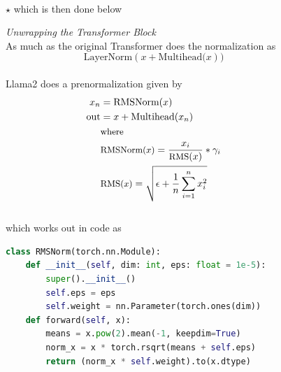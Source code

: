\documentclass[12pt]{article}
\newcommand{\customtext}[3]{%
    \vspace{#2} %
    \fontsize{13}{8}\textcolor{#1}{\textit{#3}}%
}
\newcommand{\sidecite}[1]{\textsuperscript{\textcolor{blue}{\textbf{\scriptsize#1}}}}
\newcommand{\maincitecount}{\sidecite{\stepcounter{maincite}\themaincite}}
\begin{document}
\pagebreak
\begin{figure}[!htb]
    \begin{minipage}[t]{0.65\textwidth}
    \raggedright
$\star$ which is then done below{\maincitecount}\\
\customtext{xtitle}{0em}{Unwrapping the Transformer Block}\\
As much as the original Transformer does the normalization as
\vspace{-1em}
$$\text{LayerNorm}(x  + \text{Multihead(}x))$$
\vspace{-2.7em}\\
Llama2 does a prenormalization given by
\vspace{-1em}
\begin{align*}
    x_n & = \text{RMSNorm}(x)\\
    \text{out} & = x  + \text{Multihead(}x_n)\\
    & \text{\small where}\\
    & \text{\small RMSNorm($x$)}=\frac{x_i}{\text{\small RMS}(x)}*\gamma_i\\
    & \text{\small RMS($x$)} = \sqrt{\epsilon+\frac{1}{n}\sum_{i=1}^nx_i^2}
\end{align*}
\vspace{-1.5em}\\
which works out in code as 
\begin{lstlisting}[language=python,style=python,basicstyle=\ttfamily\footnotesize]
class RMSNorm(torch.nn.Module):
    def __init__(self, dim: int, eps: float = 1e-5):
        super().__init__()
        self.eps = eps
        self.weight = nn.Parameter(torch.ones(dim))
    def forward(self, x):
        means = x.pow(2).mean(-1, keepdim=True)
        norm_x = x * torch.rsqrt(means + self.eps)
        return (norm_x * self.weight).to(x.dtype)


\end{lstlisting}
\end{minipage}
\end{figure}
\end{document}
